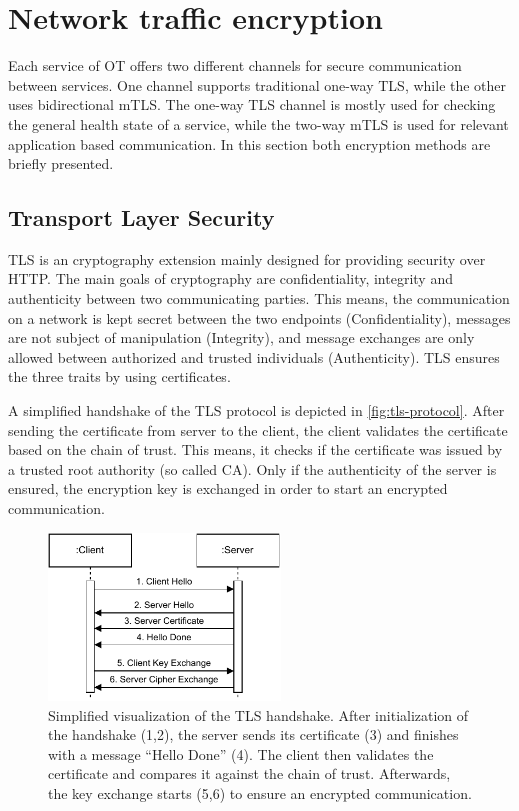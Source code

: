 \section{Network traffic encryption}
Each service of \ac{OT} offers two different channels for secure communication between services. One channel supports traditional one-way \ac{TLS}, while the other uses bidirectional \ac{mTLS}. The one-way \ac{TLS} channel is mostly used for checking the general health state of a service, while the two-way \ac{mTLS} is used for relevant application based communication.
In this section both encryption methods are briefly presented.

\subsection{Transport Layer Security}
\ac{TLS} is an cryptography extension mainly designed for providing security over \ac{HTTP}. The main goals of cryptography are confidentiality, integrity and authenticity between two communicating parties. This means, the communication on a network is kept secret between the two endpoints (Confidentiality), messages are not subject of manipulation (Integrity), and message exchanges are only allowed between authorized and trusted individuals (Authenticity). \ac{TLS} ensures the three traits by using certificates.

A simplified handshake of the \ac{TLS} protocol is depicted in \autoref{fig:tls-protocol}.
After sending the certificate from server to the client, the client validates the certificate based on the chain of trust. This means, it checks if the certificate was issued by a trusted root authority (so called \ac{CA}). Only if the authenticity of the server is ensured, the encryption key is exchanged in order to start an encrypted communication.

\begin{figure}[h]
	\centering
	\includegraphics[width=0.55\textwidth]{Figures/tls.pdf}
	\caption{Simplified visualization of the \ac{TLS} handshake\cite{Rescorla.2018}. After initialization of the handshake (1,2), the server sends its certificate (3) and finishes with a message \enquote{Hello Done} (4). The client then validates the certificate and compares it against the chain of trust. Afterwards, the key exchange starts (5,6) to ensure an encrypted communication.}
	\label{fig:tls-protocol}
\end{figure}


